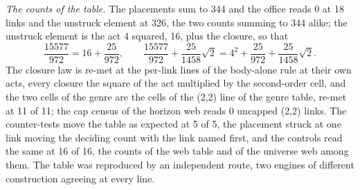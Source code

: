\begin{chproof}
\textit{The counts of the table.} The placements sum to 344 and the office reads 0 at 18 links and the unstruck element at 326, the two counts summing to 344 alike; the unstruck element is the act 4 squared, 16, plus the closure, so that
\begin{equation}
\frac{15577}{972} = 16 + \frac{25}{972}, \qquad \frac{15577}{972} + \frac{25}{1458}\sqrt{2} = 4^2 + \frac{25}{972} + \frac{25}{1458}\sqrt{2}.
\end{equation}
The closure law is re-met at the per-link lines of the body-alone rule at their own acts, every closure the square of the act multiplied by the second-order cell, and the two cells of the genre are the cells of the (2,2) line of the genre table, re-met at 11 of 11; the cap census of the horizon web reads 0 uncapped (2,2) links. The counter-tests move the table as expected at 5 of 5, the placement struck at one link moving the deciding count with the link named first, and the controls read the same at 16 of 16, the counts of the web table and of the universe web among them. The table was reproduced by an independent route, two engines of different construction agreeing at every line.
\end{chproof}

